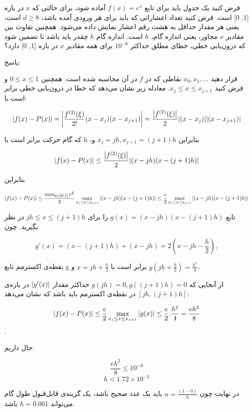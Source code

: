 فرض کنید یک جدول باید برای تابع 
\(f (x) = e^{x}\)
آماده شود، برای حالتی که 
\(x\)
در بازه [1, 0] است. 
فرض کنید تعداد اعشاراتی که باید برای هر ورودی آمده باشد، 
\(d \geq 8\)
است، یعنی هر مقدار حداقل به هشت رقم اعشار نمایش داده می‌شود.
همچنین تفاوت بین مقادیر 
\(x\)
مجاور، یعنی اندازه گام، 
\(h\)
است. اندازه گام 
\(h\)
چقدر باید باشد تا تضمین شود که درون‌یابی خطی، خطای مطلق حداکثر 
\(10^{-6}\)
برای همه مقادیر
\(x\)
در بازه [1, 0] دارد؟

\begin{comment}
\end{comment}
پاسخ:


    قرار دهید 
    $x_{0}, x_{1}, ...$
    نقاطی که در 
    $f$
    در آن محاسبه شده است.
    همچنین  $0 \leq x \leq 1 $
    و فرض کنید 
    $x_{j} \leq x \leq x_{j + 1} $.
    معادله زیر نشان می‌دهد که خطا در درون‌یابی خطی برابر است با:

    $$\abs{f(x) - P(x)} = \abs{\frac{f^{(2)}(\xi)}{2!}(x - x_{j})(x - x_{j+1})} = \frac{\abs{f^{(2)}(\xi)}}{2} \abs{(x - x_{j})}\abs{(x - x_{j+1})}$$

    که گام حرکت برابر است با h
    ،بنابراین $x_{j} = jh, x_{j + 1} = (j + 1)h$
    و 

    $$\abs{f(x) - P(x)} \leq \frac{\abs{f^{(2)}(\xi)}}{2} \abs{(x - jh)(x - (j + 1)h)}$$

    بنابراین

    $$\abs{f(x) - P(x)} \leq \frac{\max_{\xi \in [0, 1]} e^{\xi}}{2} \max_{x_{j} \leq x \leq x_{j + 1}} \abs{(x - jh)(x - (j + 1)h)} \leq \frac{e}{2} \max_{x_{j} \leq x \leq x_{j + 1}} \abs{(x - jh)(x - (j + 1)h)}$$

    تابع 
    $g(x) = (x - jh) (x - (j + 1)h)$
    را برای $jh \leq x \leq (j + 1)h$
    در نظر بگیرید.  چون

    $$g'(x) = (x - (j + 1)h) + (x - jh) = 2 (x - jh - \frac{h}{2}),$$

    نقطه‌ی اکسترمم تابع g برابر است با $x = jh + \frac{h}{2}$ و $g(jh + \frac{h}{2}) = \frac{h^{2}}{4}$.

    از آنجایی که $g(jh) = 0, g((j + 1)h) = 0$ حداکثر مقدار $\abs{g'(x)}$  در بازه‌ی  $[jh, (j + 1)h]$ در نقطه‌ی اکسترمم باید باشد که نشان می‌دهد: 

    $$\abs{f(x) - P(x)} \leq \frac{e}{2} \max_{x_{j} \leq x \leq x_{x + 1}} \abs{g(x)} \leq \frac{e}{2}.\frac{h^{2}}{4} = \frac{eh^{2}}{8}$$.

    حال داریم:

    $$\frac{eh^{2}}{8} \leq 10^{-6}$$
    $$ h < 1.72 \times 10 ^ {-3}$$

    در نهایت چون $n = \frac{(1 - 0)}{h}$ باید یک عدد صحیح باشد، یک گزینه‌ی قابل‌قبول طول گام می‌تواند $h = 0.001$ باشد.

